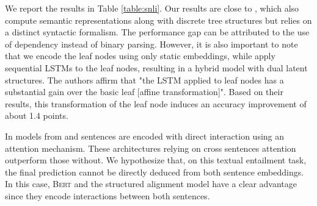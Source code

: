We report the results in Table \ref{table:snli}. Our results are close to \textcite{choi_18}, which also compute semantic representations along with discrete tree structures but relies on a distinct syntactic formalism. The performance gap can be attributed to the use of dependency instead of binary parsing. However, it is also important to note that we encode the leaf nodes using only static embeddings, while \textcite{choi_18} apply sequential LSTMs to the leaf nodes, resulting in a hybrid model with dual latent structures. The authors affirm that "the LSTM applied to leaf nodes has a substantial gain over the basic leaf [affine transformation]". Based on their results, this transformation of the leaf node induces an accuracy improvement of about 1.4 points. 

In models from \textcite{liu_18} and \textcite{zhang_20} sentences are encoded with direct interaction using an attention mechanism. These architectures relying on cross sentences attention outperform those without.
We hypothesize that, 
on this textual entailment task, the final prediction cannot be directly deduced from both sentence embeddings. In this case, \textsc{Bert} and the structured alignment model have a clear advantage since they encode interactions between both sentences.





